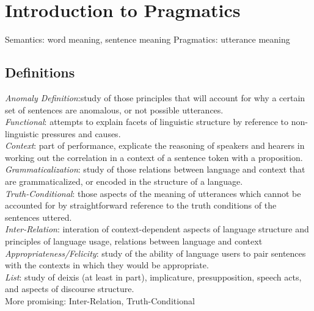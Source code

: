 \section{Introduction to Pragmatics}
Semantics: word meaning, sentence meaning
Pragmatics: utterance meaning
\subsection*{Definitions}
\emph{Anomaly Definition}:study of those principles that will account for why a certain set of sentences are anomalous, or not possible
utterances.\\
\emph{Functional}: attempts to explain facets of linguistic structure by reference to non-linguistic pressures and causes.\\
\emph{Context}: part of performance, explicate the reasoning of speakers and hearers in working out the correlation in a context of a sentence token with a proposition.\\
\emph{Grammaticalization}: study of those relations between language and context that are grammaticalized, or encoded in the structure of a language.\\
\emph{Truth-Conditional}: those aspects of the meaning of utterances which cannot be accounted for by straightforward reference to the truth conditions of the sentences uttered.\\
\emph{Inter-Relation}: interation of context-dependent aspects of language structure and principles of language usage, relations between
language and context\\
\emph{Appropriateness/Felicity}: study of the ability of language users to
pair sentences with the contexts in which they would be
appropriate.\\
\emph{List}: study of deixis (at least in part), implicature, presupposition, speech acts, and aspects of
discourse structure.\\
More promising: Inter-Relation, Truth-Conditional
